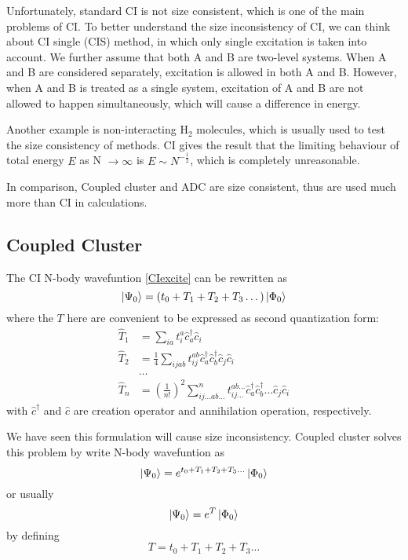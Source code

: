 Unfortunately, standard CI is not size consistent, which is one of the main problems of CI.
To better understand the size inconsistency of CI, we can think about CI single (CIS) method, in which only single excitation is taken into account.
We further assume that both A and B are two-level systems.
When A and B are considered separately, excitation is allowed in both A and B.
However, when A and B is treated as a single system, excitation of A and B are not allowed to happen simultaneously, which will cause a difference in energy.

Another example is non-interacting $\text{H}_2$ molecules, which is usually used to test the size consistency of methods. \cite{h2problem}
CI gives the result that the limiting behaviour of total energy $E$ as N $\rightarrow \infty$ is $E \sim N^{-\frac{1}{2}}$, which is completely unreasonable.

In comparison, Coupled cluster and ADC are size consistent, thus are used much more than CI in calculations.

\subsection{Coupled Cluster}
The CI N-body wavefuntion \ref{CIexcite} can be rewritten as 
\begin{equation}
\ket{\Psi_0}=(t_0+T_1+T_2+T_3 \dots)\ket{\Phi_0}
\end{equation}
where the $T$ here are convenient to be expressed as second quantization form:
\begin{equation}
\begin{aligned}
	\hat{T}_{1} &=\sum_{i a} t_{i}^{a} \hat{c}_{a}^{\dagger} \hat{c}_{i}
	\\
	\hat{T}_{2} &=\frac{1}{4} \sum_{i j a b} t_{i j}^{a b} \hat{c}_{a}^{\dagger} \hat{c}_{b}^{\dagger} \hat{c}_{j} \hat{c}_{i}
	\\
	&\dots
	\\
	\hat{T}_{n}&=\left(\frac{1}{n !}\right)^{2} \sum_{i j \ldots a b \ldots}^{n} t_{i j \ldots}^{a b \ldots} \hat{c}_{a}^{\dagger} \hat{c}_{b}^{\dagger} \ldots \hat{c}_{j} \hat{c}_{i}
\end{aligned}
\end{equation}
with $\hat{c}^{\dagger}$ and $\hat{c}$ are creation operator and annihilation operation, respectively.

We have seen this formulation will cause size inconsistency.
Coupled cluster solves this problem by write N-body wavefuntion as
\begin{equation}
\ket{\Psi_0}=e^{t_0+T_1+T_2+T_3 \dots}\ket{\Phi_0}
\end{equation}
or usually
\begin{equation}
\ket{\Psi_0}=e^{T}\ket{\Phi_0}
\end{equation}
by defining
\begin{equation}
T=t_0+T_1+T_2+T_3 \dots
\end{equation}

